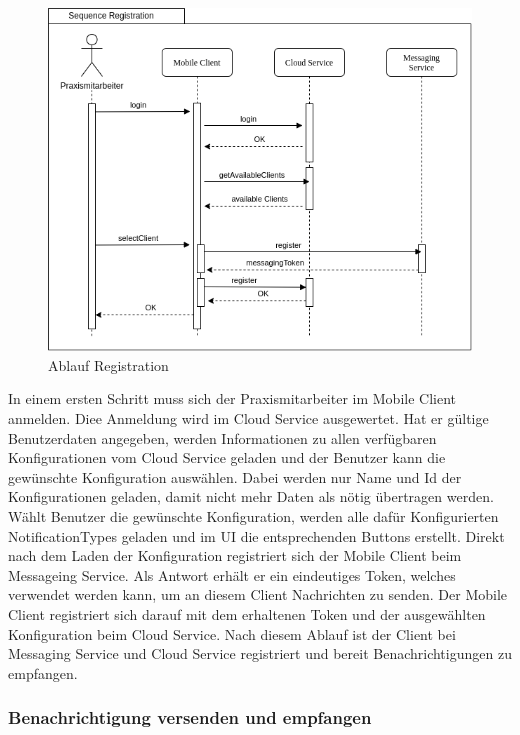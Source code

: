 \begin{figure}[h]
    \centering
    \begin{minipage}[b]{0.7\textwidth}
        \includegraphics[width=\textwidth]{graphics/Sequence_Notification_Register}
        \caption{Ablauf Registration}
    \end{minipage}
\end{figure}

In einem ersten Schritt muss sich der Praxismitarbeiter im Mobile Client anmelden.
Diee Anmeldung wird im Cloud Service ausgewertet.
Hat er gültige Benutzerdaten angegeben, werden Informationen zu allen verfügbaren Konfigurationen vom Cloud Service geladen und der Benutzer kann die gewünschte Konfiguration auswählen.
Dabei werden nur Name und Id der Konfigurationen geladen, damit nicht mehr Daten als nötig übertragen werden.
Wählt Benutzer die gewünschte Konfiguration, werden alle dafür Konfigurierten NotificationTypes geladen und im UI die entsprechenden Buttons erstellt.
Direkt nach dem Laden der Konfiguration registriert sich der Mobile Client beim Messageing Service.
Als Antwort erhält er ein eindeutiges Token, welches verwendet werden kann, um an diesem Client Nachrichten zu senden.
Der Mobile Client registriert sich darauf mit dem erhaltenen Token und der ausgewählten Konfiguration beim Cloud Service.
Nach diesem Ablauf ist der Client bei Messaging Service und Cloud Service registriert und bereit Benachrichtigungen zu empfangen.

\clearpage

\subsubsection*{Benachrichtigung versenden und empfangen}

